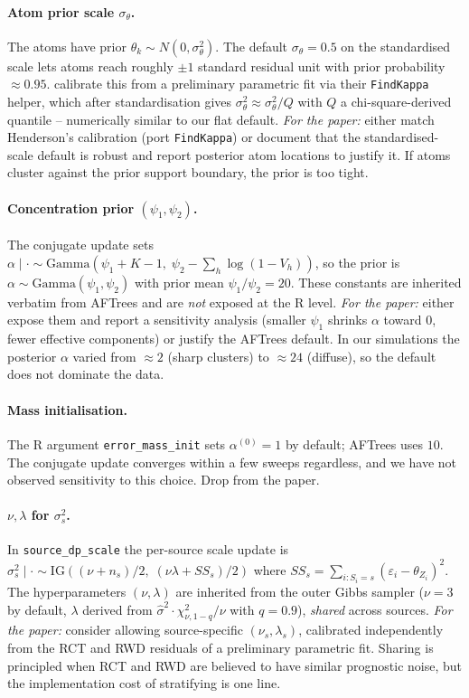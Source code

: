 \documentclass[11pt]{article}
\theoremstyle{plain}
\theoremstyle{definition}
\theoremstyle{remark}
\newcommand{\1}{\mathds{1}}
\begin{document}
\paragraph{Atom prior scale $\sigma_\theta$.} The atoms have prior $\theta_k \sim N(0, \sigma_\theta^2)$. The default $\sigma_\theta = 0.5$ on the standardised scale lets atoms reach roughly $\pm 1$ standard residual unit with prior probability $\approx 0.95$. \citet{henderson2020individualized} calibrate this from a preliminary parametric fit via their \texttt{FindKappa} helper, which after standardisation gives $\sigma_\theta^2 \approx \sigma_\theta^2/Q$ with $Q$ a chi-square-derived quantile -- numerically similar to our flat default. \emph{For the paper:} either match Henderson's calibration (port \texttt{FindKappa}) or document that the standardised-scale default is robust and report posterior atom locations to justify it. If atoms cluster against the prior support boundary, the prior is too tight.

\paragraph{Concentration prior $(\psi_1, \psi_2)$.} The conjugate update sets $\alpha \mid \cdot \sim \mathrm{Gamma}(\psi_1 + K - 1,\; \psi_2 - \sum_h \log(1 - V_h))$, so the prior is $\alpha \sim \mathrm{Gamma}(\psi_1, \psi_2)$ with prior mean $\psi_1/\psi_2 = 20$. These constants are inherited verbatim from AFTrees and are \emph{not} exposed at the R level. \emph{For the paper:} either expose them and report a sensitivity analysis (smaller $\psi_1$ shrinks $\alpha$ toward $0$, fewer effective components) or justify the AFTrees default. In our simulations the posterior $\alpha$ varied from $\approx 2$ (sharp clusters) to $\approx 24$ (diffuse), so the default does not dominate the data.

\paragraph{Mass initialisation.} The R argument \texttt{error\_mass\_init} sets $\alpha^{(0)} = 1$ by default; AFTrees uses $10$. The conjugate update converges within a few sweeps regardless, and we have not observed sensitivity to this choice. Drop from the paper.

\paragraph{$\nu, \lambda$ for $\sigma_s^2$.} In \texttt{source\_dp\_scale} the per-source scale update is $\sigma_s^2 \mid \cdot \sim \mathrm{IG}((\nu + n_s)/2,\; (\nu\lambda + SS_s)/2)$ where $SS_s = \sum_{i: S_i = s}(\varepsilon_i - \theta_{Z_i})^2$. The hyperparameters $(\nu, \lambda)$ are inherited from the outer Gibbs sampler ($\nu = 3$ by default, $\lambda$ derived from $\hat\sigma^2 \cdot \chi^2_{\nu, 1-q}/\nu$ with $q = 0.9$), \emph{shared} across sources. \emph{For the paper:} consider allowing source-specific $(\nu_s, \lambda_s)$, calibrated independently from the RCT and RWD residuals of a preliminary parametric fit. Sharing is principled when RCT and RWD are believed to have similar prognostic noise, but the implementation cost of stratifying is one line.
\end{document}
